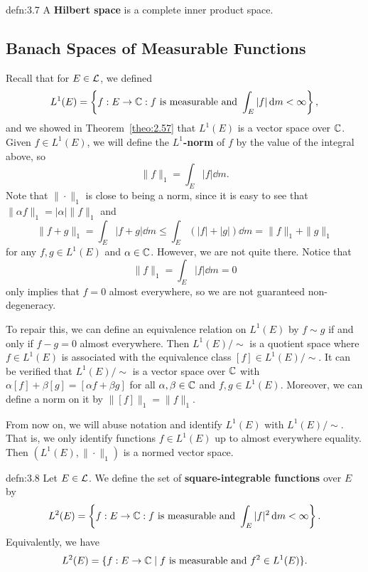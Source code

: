\begin{defn}{defn:3.7}
    A {\bf Hilbert space} is a complete inner product space. 
\end{defn}

\subsection{Banach Spaces of Measurable Functions} \label{subsec:3.2}
Recall that for $E \in {\cal L}$, we defined 
\[ L^1(E) = \left\{ f : E \to \mathbb{C} : f \text{ is measurable and } 
\int_E |f|\,\mathrm{d} m < \infty \right\}, \] 
and we showed in Theorem~\ref{theo:2.57} that $L^1(E)$ is a vector space 
over $\mathbb{C}$. Given $f \in L^1(E)$, we will define the \textbf{$L^1$-norm} of 
$f$ by the value of the integral above, so 
\[ \|f\|_1 = \int_E |f|\dd m. \] 
Note that $\|\cdot\|_1$ is close to being a norm, since it is 
easy to see that $\|\alpha f\|_1 = |\alpha|\|f\|_1$ and 
\[ \|f + g\|_1 = \int_E |f+g|\dd m \leq \int_E (|f| + |g|)\dd m 
= \|f\|_1 + \|g\|_1 \] 
for any $f, g \in L^1(E)$ and $\alpha \in \mathbb{C}$. However, we are not quite 
there. Notice that 
\[ \|f\|_1 = \int_E |f|\dd m = 0 \] 
only implies that $f = 0$ almost everywhere, so we are not guaranteed 
non-degeneracy. 

To repair this, we can define an equivalence relation on $L^1(E)$ by 
$f \sim g$ if and only if $f - g = 0$ almost everywhere. Then $L^1(E)/\!\sim$ 
is a quotient space where $f \in L^1(E)$ is associated with the 
equivalence class $[f] \in L^1(E)/\!\sim$. It can be verified that 
$L^1(E)/\!\sim$ is a vector space over $\mathbb{C}$ with $\alpha [f] + \beta [g] 
= [\alpha f + \beta g]$ for all $\alpha, \beta \in \mathbb{C}$ and $f, g \in L^1(E)$. 
Moreover, we can define a norm on it by $\|[f]\|_1 = \|f\|_1$.

From now on, we will abuse notation and identify $L^1(E)$ with 
$L^1(E)/\!\sim$. That is, we only identify functions $f \in L^1(E)$ up to 
almost everywhere equality. Then $(L^1(E), \|\cdot\|_1)$ is a normed 
vector space. 

\begin{defn}{defn:3.8}
    Let $E \in {\cal L}$. We define the set of {\bf square-integrable 
    functions} over $E$ by 
    \[ L^2(E) = \left\{ f : E \to \mathbb{C} : f \text{ is measurable and }
    \int_E |f|^2 \,\mathrm{d} m < \infty \right\}. \] 
    Equivalently, we have 
    \[ L^2(E) = \{f : E \to \mathbb{C} \mid f \text{ is measurable and } 
    f^2 \in L^1(E)\}. \] 
\end{defn}

